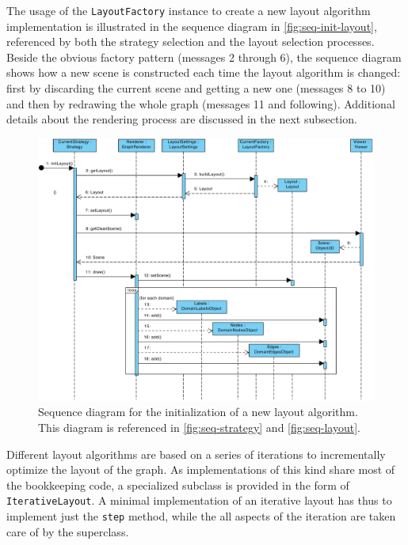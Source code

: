The usage of the \texttt{LayoutFactory} instance to create a new layout algorithm implementation is illustrated in the sequence diagram in \vref{fig:seq-init-layout}, referenced by both the strategy selection and the layout selection processes. Beside the obvious factory pattern (messages 2 through 6), the sequence diagram shows how a new scene is constructed each time the layout algorithm is changed: first by discarding the current scene and getting a new one (messages 8 to 10) and then by redrawing the whole graph (messages 11 and following). Additional details about the rendering process are discussed in the next subsection.

\begin{figure}
  \begin{adjustwidth}{-17mm}{-6.5mm}  
    \includegraphics[width=\linewidth]{images/diagrams/seq-init-layout}
  \end{adjustwidth}
  \caption[Sequence diagram for the initialization of a new layout algorithm.]{Sequence diagram for the initialization of a new layout algorithm. This diagram is referenced in \ref{fig:seq-strategy} and \ref{fig:seq-layout}.}
  \label{fig:seq-init-layout}
\end{figure}

Different layout algorithms are based on a series of iterations to incrementally optimize the layout of the graph. As implementations of this kind share most of the bookkeeping code, a specialized subclass is provided in the form of \texttt{IterativeLayout}. A minimal implementation of an iterative layout has thus to implement just the \texttt{step} method, while the all aspects of the iteration are taken care of by the superclass.

